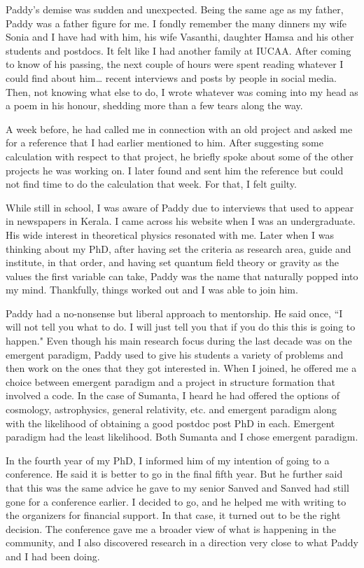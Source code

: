 \documentclass[prd, preprint, longbibliography, 12pt]{revtex4-2}
\begin{document}
\medskip

\noindent Paddy's demise was sudden and unexpected. Being the same age as my father, Paddy was a father figure for me. I fondly remember the many dinners my wife Sonia and I have had with him, his wife Vasanthi, daughter Hamsa and his other students and postdocs. It felt like I had another family at IUCAA. After coming to know of his passing, the next couple of hours were spent reading whatever I could find about him… recent interviews and posts by people in social media. Then, not knowing what else to do, I wrote whatever was coming into my head as a poem in his honour, shedding more than a few tears along the way.

A week before, he had called me in connection with an old project and asked me for a reference that I had earlier mentioned to him.  After suggesting some calculation with respect to that project, he briefly spoke about some of the other projects he was working on. I later found and sent him the reference but could not find time to do the calculation that week. For that, I felt guilty.

While still in school, I was aware of Paddy due to interviews that used to appear in newspapers in Kerala. I came across his website when I was an undergraduate. His wide interest in theoretical physics resonated with me. Later when I was thinking about my PhD, after having set the criteria as research area, guide and institute, in that order, and having set quantum field theory or gravity as the values the first variable can take, Paddy was the name that naturally popped into my mind. Thankfully, things worked out and I was able to join him.

Paddy had a no-nonsense but liberal approach to mentorship. He said once, ``I will not tell you what to do. I will just tell you that if you do this this is going to happen."  Even though his main research focus during the last decade was on the emergent paradigm, Paddy used to give his students a variety of problems and then work on the ones that they got interested in. When I joined, he offered me a choice between emergent paradigm and a project in structure formation that involved a code. In the case of Sumanta, I heard he had offered the options of cosmology, astrophysics, general relativity, etc. and emergent paradigm along with the likelihood of obtaining a good postdoc post PhD in each. Emergent paradigm had the least likelihood. Both Sumanta and I chose emergent paradigm. 

In the fourth year of my PhD, I informed him of my intention of going to a conference. He said it is better to go in the final fifth year. But he further said that this was the same advice he gave to my senior Sanved and Sanved had still gone for a conference earlier. I decided to go, and he helped me with writing to the organizers for financial support. In that case, it turned out to be the right decision. The conference gave me a broader view of what is happening in the community, and I also discovered research in a direction very close to what Paddy and I had been doing.
\end{document}
